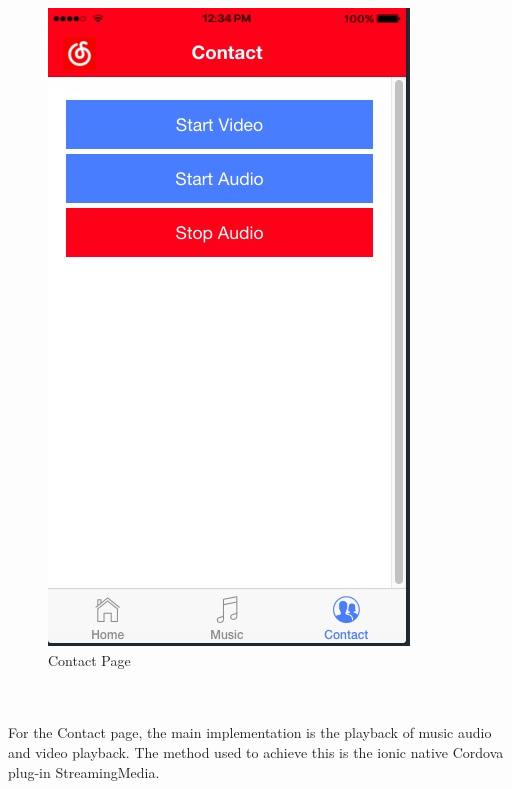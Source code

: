 \begin{figure}[h]
	\centering
	\includegraphics[scale=0.5]{img/Contact.png}
	\caption{Contact Page}
	\label{fig:6.6.2.3 cubed graph}
\end{figure}
\\ \\ For the Contact page, the main implementation is the playback of music audio and video playback. The method used to achieve this is the ionic native Cordova plug-in StreamingMedia.



